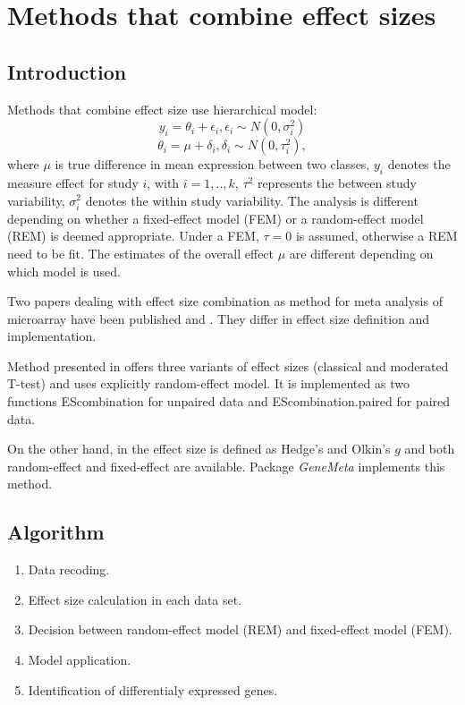 \documentclass[a4paper]{report}
\begin{document}
\chapter{Methods that combine effect sizes}
\section*{Introduction}
Methods that combine effect size use hierarchical model:
\[ y_i=\theta_i+\epsilon_i, \epsilon_i \sim N(0,\sigma_i^2)\]
\[ \theta_i=\mu+\delta_i, \delta_i \sim N(0,\tau_i^2),\]
where $\mu$ is true difference in mean expression between two classes, $y_i$ denotes the measure effect for study $i$, with $i=1,..,k$, $\tau^2$ represents the between study variability, $\sigma_i^2$ denotes the within study variability. The analysis is different depending on whether a fixed-effect model (FEM) or a random-effect model (REM) is deemed appropriate. Under a FEM, $\tau=0$ is assumed, otherwise a REM need to be fit. The estimates of the overall effect $\mu$ are different depending on which model is used. \par
Two papers dealing with effect size combination as method for meta analysis of microarray have been published \cite{Marot} and \cite{Choi2003}. They differ in effect size definition and implementation.\par 
Method presented in \cite{Marot} offers three variants of effect sizes (classical and moderated T-test) and uses explicitly random-effect model. It is implemented as two functions {\ttfamily EScombination} for unpaired data and {\ttfamily EScombination.paired} for paired data.  
\par On the other hand, in \cite{Choi2003} the effect size is defined as Hedge's and Olkin's $g$ and both random-effect and fixed-effect are available. Package \emph{GeneMeta} \cite{GeneMeta} implements this method. 
\section*{Algorithm}
\begin{enumerate}
\item Data recoding.
\item Effect size calculation in each data set.
\item Decision between random-effect model (REM) and fixed-effect model (FEM).
\item Model application.
\item Identification of differentialy expressed genes.
\end{enumerate}
\end{document}
